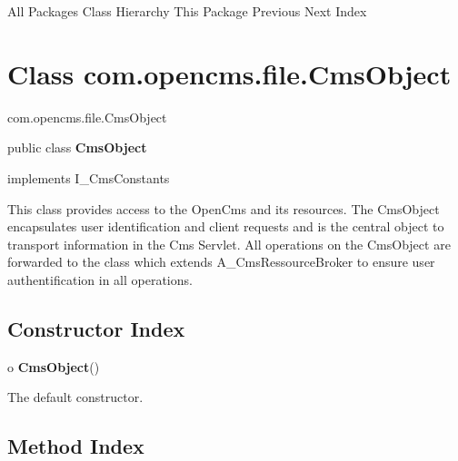 \begin{PRE}
All Packages  Class Hierarchy  This Package  Previous  Next  Index
\end{PRE}

\htmlHR

\section{  Class com.opencms.file.CmsObject }

\begin{PRE}
com.opencms.file.CmsObject
\end{PRE}

\htmlHR

\begin{description}
\item public class {\bf CmsObject}
\item implements I\_CmsConstants
\end{description}

This class provides access to the OpenCms and its resources. \htmlBR
The CmsObject encapsulates user identification and client requests and is the
central object to transport information in the Cms Servlet. \htmlBR
All operations on the CmsObject are forwarded to the class which extends
A\_CmsRessourceBroker to ensure user authentification in all operations.

\htmlHR

\subsection*{  Constructor Index }

\begin{description}
\item o {\bf CmsObject}()

The default constructor.
\end{description}

\subsection*{  Method Index }

